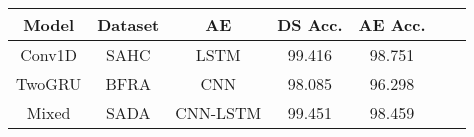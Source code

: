 \begin{tabular}{c|cccccc} \toprule
Model  & Dataset   & AE        & DS Acc. & AE Acc. \\\midrule
Conv1D & SAHC      & LSTM      & 99.416  & 98.751  \\
TwoGRU & BFRA      & CNN       & 98.085  & 96.298  \\
Mixed  & SADA      & CNN-LSTM  & 99.451  & 98.459  \\\bottomrule
\end{tabular}
